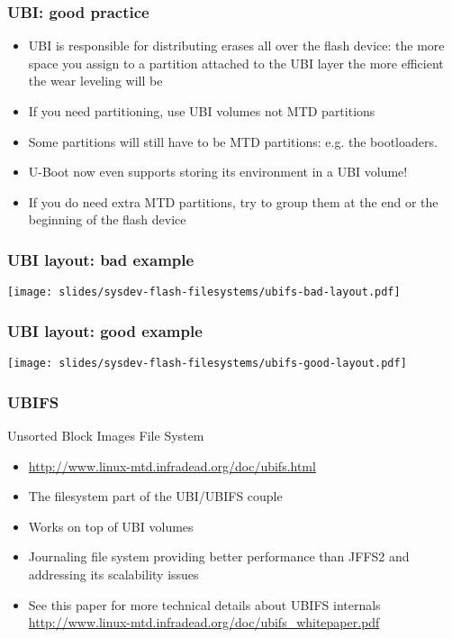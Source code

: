 \begin{frame}
  \frametitle{UBI: good practice}
  \begin{itemize}
  \item UBI is responsible for distributing erases all over the flash
    device: the more space you assign to a partition attached to the
    UBI layer the more efficient the wear leveling will be
  \item If you need partitioning, use UBI volumes not MTD partitions
  \item Some partitions will still have to be MTD partitions: e.g. the
    bootloaders.
  \item U-Boot now even supports storing its environment in a UBI volume!
  \item If you do need extra MTD partitions, try to group them at the end
    or the beginning of the flash device
  \end{itemize}
\end{frame}

\begin{frame}
  \frametitle{UBI layout: bad example}
  \begin{center}
    \texttt{[image: slides/sysdev-flash-filesystems/ubifs-bad-layout.pdf]}
  \end{center}
\end{frame}

\begin{frame}
  \frametitle{UBI layout: good example}
  \begin{center}
    \texttt{[image: slides/sysdev-flash-filesystems/ubifs-good-layout.pdf]}
  \end{center}
\end{frame}

\begin{frame}
  \frametitle{UBIFS}
  Unsorted Block Images File System
  \begin{itemize}
  \item \url{http://www.linux-mtd.infradead.org/doc/ubifs.html}
  \item The filesystem part of the UBI/UBIFS couple
  \item Works on top of UBI volumes
  \item Journaling file system providing better performance than
    JFFS2 and addressing its scalability issues
  \item See this paper for more technical details about UBIFS internals
    \url{http://www.linux-mtd.infradead.org/doc/ubifs_whitepaper.pdf}
  \end{itemize}
\end{frame}


